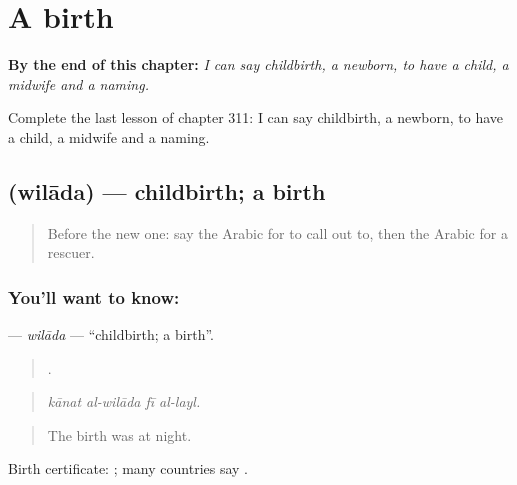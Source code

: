 
\chapter{A birth}
\label{ch:ar-a-birth}

\begin{chapteropening}
\textbf{By the end of this chapter:} \emph{I can say childbirth, a newborn, to have a child, a midwife and a naming.}

Complete the last lesson of chapter 311: I can say childbirth, a newborn, to have a child, a midwife and a naming.
\end{chapteropening}

\section[\texorpdfstring{\ar{ولادة} (wilāda)}{ولادة (wilāda)}]{ (wilāda) — childbirth; a birth}

\label{lesson:AR-C311-wilada}



\begin{quote}
Before the new one: say the Arabic for to call out to, then the Arabic for a rescuer.
\end{quote}

\subsection*{You'll want to know: }
\textbf{} — \emph{wilāda} — \textquotedblleft{}childbirth; a birth\textquotedblright{}.

\begin{quote}
   .
\end{quote}

\begin{quote}
\emph{kānat al-wilāda fī al-layl.}
\end{quote}

\begin{quote}
The birth was at night.
\end{quote}

Birth certificate:  ; many countries say  .

